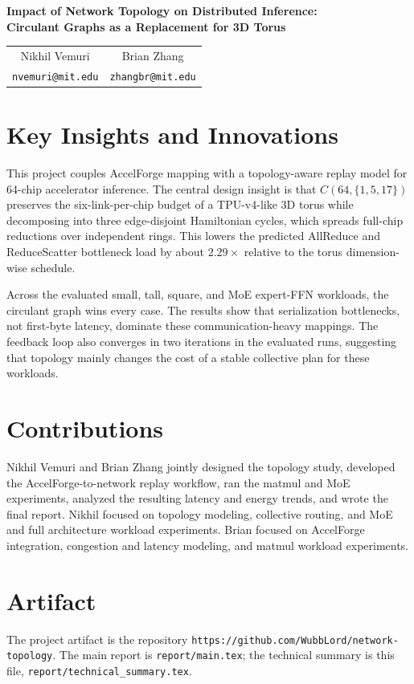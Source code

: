 \setcounter{section}{0}
\renewcommand{\thesection}{\Roman{section}}

\begin{center}
{\LARGE\bfseries Impact of Network Topology on Distributed Inference:\\
Circulant Graphs as a Replacement for 3D Torus\par}
\vspace{1.0em}
\begin{tabular}{cc}
Nikhil Vemuri & Brian Zhang \\
\texttt{nvemuri@mit.edu} & \texttt{zhangbr@mit.edu}
\end{tabular}
\end{center}
\vspace{1.0em}

\section{Key Insights and Innovations}
This project couples AccelForge mapping with a topology-aware replay model for
64-chip accelerator inference. The central design insight is that
$C(64,\{1,5,17\})$ preserves the six-link-per-chip budget of a TPU-v4-like 3D
torus while decomposing into three edge-disjoint Hamiltonian cycles, which
spreads full-chip reductions over independent rings. This lowers the predicted
AllReduce and ReduceScatter bottleneck load by about $2.29\times$ relative to
the torus dimension-wise schedule.

Across the evaluated small, tall, square, and MoE expert-FFN workloads, the
circulant graph wins every case. The results show that serialization
bottlenecks, not first-byte latency, dominate these communication-heavy
mappings. The feedback loop also converges in two iterations in the evaluated
runs, suggesting that topology mainly changes the cost of a stable collective
plan for these workloads.

\section{Contributions}
Nikhil Vemuri and Brian Zhang jointly designed the topology study, developed
the AccelForge-to-network replay workflow, ran the matmul and MoE experiments,
analyzed the resulting latency and energy trends, and wrote the final report.
Nikhil focused on topology modeling, collective routing, and MoE and full architecture workload
experiments. Brian focused on AccelForge integration, congestion and latency modeling, and matmul workload experiments.

\section{Artifact}
The project artifact is the repository
\texttt{https://github.com/WubbLord/network-topology}. The main report is
\texttt{report/main.tex}; the technical summary is this file,
\texttt{report/technical\_summary.tex}.
